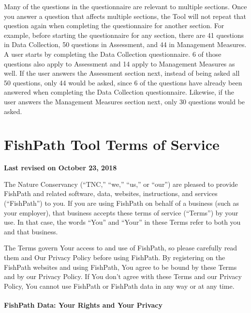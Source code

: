 \documentclass[
  11pt,
]{book}
\begin{document}
Many of the questions in the questionnaire are relevant to multiple sections. Once you answer a question that affects multiple sections, the Tool will not repeat that question again when completing the questionnaire for another section. For example, before starting the questionnaire for any section, there are 41 questions in Data Collection, 50 questions in Assessment, and 44 in Management Measures. A user starts by completing the Data Collection questionnaire. 6 of those questions also apply to Assessment and 14 apply to Management Measures as well. If the user answers the Assessment section next, instead of being asked all 50 questions, only 44 would be asked, since 6 of the questions have already been answered when completing the Data Collection questionnaire. Likewise, if the user answers the Management Measures section next, only 30 questions would be asked.

\hypertarget{terms}{%
\chapter{FishPath Tool Terms of Service}\label{terms}}

\textbf{Last revised on October 23, 2018}

The Nature Conservancy (``TNC,'' ``we,'' ``us,'' or ``our'') are pleased to provide FishPath and related software, data, websites, instructions, and services (``FishPath'') to you. If you are using FishPath on behalf of a business (such as your employer), that business accepts these terms of service (``Terms'') by your use. In that case, the words ``You'' and ``Your'' in these Terms refer to both you and that business.

The Terms govern Your access to and use of FishPath, so please carefully read them and Our Privacy Policy before using FishPath. By registering on the FishPath websites and using FishPath, You agree to be bound by these Terms and by our Privacy Policy. If You don't agree with these Terms and our Privacy Policy, You cannot use FishPath or FishPath data in any way or at any time.

\hypertarget{fishpath-data-your-rights-and-your-privacy}{%
\subsubsection*{FishPath Data: Your Rights and Your Privacy}\label{fishpath-data-your-rights-and-your-privacy}}
\end{document}
